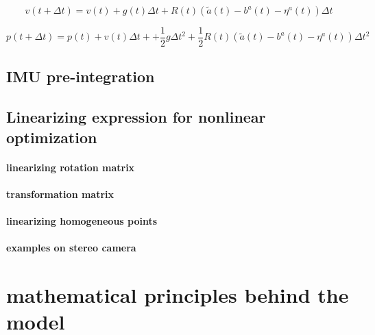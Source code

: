 \documentclass[10pt,a4paper]{article}
\begin{document}
\begin{equation}
v(t+\Delta t) =v(t) + g(t) \Delta t + R(t)(\tilde{a}(t) -b^a(t) - \eta^a(t)) \Delta t
\end{equation}

\begin{equation}
p(t+\Delta t) = p(t) + v(t)\Delta t + + \frac{1}{2}g\Delta t^2
 + \frac{1}{2} R(t)(\tilde{a}(t) -b^a(t) - \eta^a(t)) \Delta t^2
\end{equation}

\subsection{IMU pre-integration}


\subsection{Linearizing expression for nonlinear optimization}
\paragraph{linearizing rotation matrix}
\paragraph{transformation matrix}
\paragraph{linearizing homogeneous points}
\paragraph{examples on stereo camera}
\subsection{}
\subsection{}
\subsection{}
\subsection{}

\section{mathematical principles behind the model}
\end{document}
